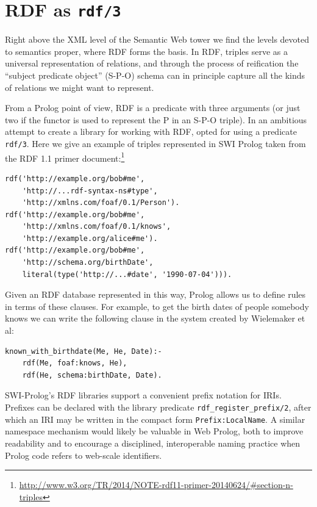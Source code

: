\section{RDF as \texttt{rdf/3}}\label{sec:instead-of-rdf}

\noindent Right above the XML level of the Semantic Web tower we find the levels devoted to semantics proper, where RDF forms the basis. In RDF, triples serve as a universal representation of relations, and through the process of reification the ``subject predicate object'' (S-P-O) schema can in principle capture all the kinds of relations we might want to represent.

From a Prolog point of view, RDF is a predicate with three arguments (or just two if the functor is used to represent the P in an S-P-O triple). In an ambitious attempt to create a library for working with RDF, \citet{wielemaker2016cliopatria} opted for using a predicate \texttt{rdf/3}. Here we give an example of triples represented in SWI Prolog taken from the RDF 1.1 primer document:\footnote{\url{http://www.w3.org/TR/2014/NOTE-rdf11-primer-20140624/\#section-n-triples}}

\begin{verbatim}
rdf('http://example.org/bob#me',
    'http://...rdf-syntax-ns#type',
    'http://xmlns.com/foaf/0.1/Person').
rdf('http://example.org/bob#me',
    'http://xmlns.com/foaf/0.1/knows',
    'http://example.org/alice#me').
rdf('http://example.org/bob#me',
    'http://schema.org/birthDate',
    literal(type('http://...#date', '1990-07-04'))).
\end{verbatim}

\noindent Given an RDF database represented in this way, Prolog allows us to define rules in terms of these clauses. For example, to get the birth dates of people somebody knows we can write the following clause in the system created by Wielemaker et al:

\begin{verbatim}
known_with_birthdate(Me, He, Date):-
    rdf(Me, foaf:knows, He),
    rdf(He, schema:birthDate, Date).
\end{verbatim}

\noindent SWI-Prolog's RDF libraries support a convenient prefix notation for IRIs. Prefixes can be declared with the library predicate \texttt{rdf\_register\_prefix/2}, after which an IRI may be written in the compact form \texttt{Prefix:LocalName}. A similar namespace mechanism would likely be valuable in Web Prolog, both to improve readability and to encourage a disciplined, interoperable naming practice when Prolog code refers to web-scale identifiers.

